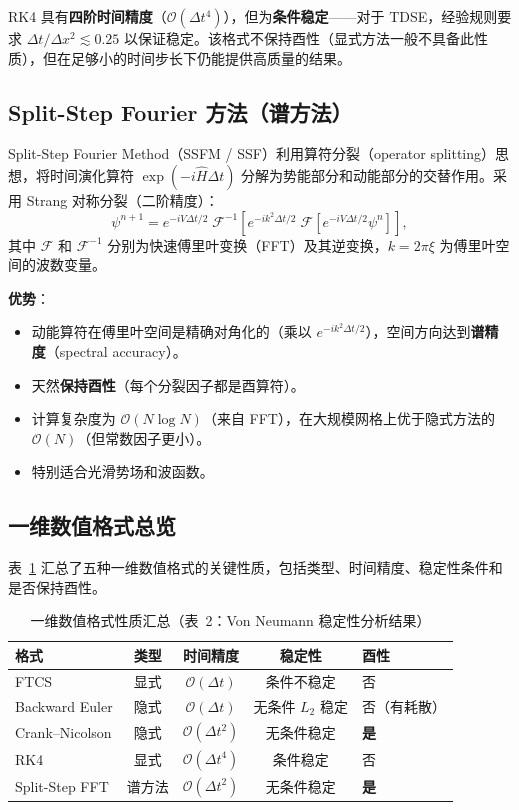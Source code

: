 \documentclass[12pt,a4paper]{article}
\begin{document}
RK4 具有\textbf{四阶时间精度}（$\mathcal{O}(\Delta t^4)$），但为\textbf{条件稳定}——对于 TDSE，经验规则要求 $\Delta t/\Delta x^2 \lesssim 0.25$ 以保证稳定。该格式不保持酉性（显式方法一般不具备此性质），但在足够小的时间步长下仍能提供高质量的结果。

\subsection{Split-Step Fourier 方法（谱方法）}

Split-Step Fourier Method（SSFM / SSF）利用算符分裂（operator splitting）思想，将时间演化算符 $\exp(-i\hat{H}\Delta t)$ 分解为势能部分和动能部分的交替作用。采用 Strang 对称分裂（二阶精度）：
\begin{equation}\label{eq:ssf}
    \psi^{n+1} = e^{-iV\Delta t/2} \;
    \mathcal{F}^{-1}\left[ e^{-i k^2 \Delta t/2} \;
    \mathcal{F}[e^{-iV\Delta t/2}\psi^n] \right],
\end{equation}
其中 $\mathcal{F}$ 和 $\mathcal{F}^{-1}$ 分别为快速傅里叶变换（FFT）及其逆变换，$k = 2\pi\xi$ 为傅里叶空间的波数变量。

\textbf{优势}：
\begin{itemize}
    \item 动能算符在傅里叶空间是精确对角化的（乘以 $e^{-ik^2\Delta t/2}$），空间方向达到\textbf{谱精度}（spectral accuracy）。
    \item 天然\textbf{保持酉性}（每个分裂因子都是酉算符）。
    \item 计算复杂度为 $\mathcal{O}(N\log N)$（来自 FFT），在大规模网格上优于隐式方法的 $\mathcal{O}(N)$（但常数因子更小）。
    \item 特别适合光滑势场和波函数。
\end{itemize}

\subsection{一维数值格式总览}

表~\ref{tab:methods} 汇总了五种一维数值格式的关键性质，包括类型、时间精度、稳定性条件和是否保持酉性。

\begin{table}[H]
\centering
\caption{一维数值格式性质汇总（表~2：Von Neumann 稳定性分析结果）}
\label{tab:methods}
\begin{tabular}{@{}lcccl@{}}
\toprule
\textbf{格式} & \textbf{类型} & \textbf{时间精度} & \textbf{稳定性} & \textbf{酉性} \\
\midrule
FTCS             & 显式     & $\mathcal{O}(\Delta t)$    & 条件不稳定       & 否  \\
Backward Euler   & 隐式     & $\mathcal{O}(\Delta t)$    & 无条件 $L_2$ 稳定 & 否（有耗散） \\
Crank--Nicolson  & 隐式     & $\mathcal{O}(\Delta t^2)$  & 无条件稳定       & \textbf{是} \\
RK4              & 显式     & $\mathcal{O}(\Delta t^4)$  & 条件稳定         & 否  \\
Split-Step FFT   & 谱方法   & $\mathcal{O}(\Delta t^2)$  & 无条件稳定       & \textbf{是} \\
\bottomrule
\end{tabular}
\end{table}
\end{document}
